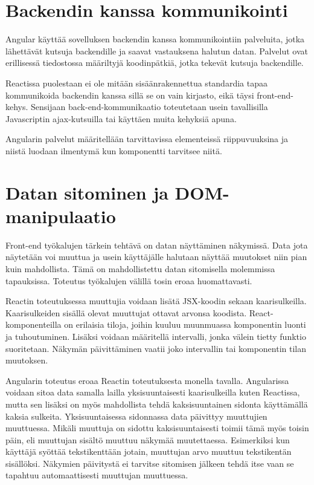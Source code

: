 \documentclass[a4paper,12pt,twoside]{article} %
\begin{document}
{\newpage

\section{Backendin kanssa kommunikointi}

Angular käyttää sovelluksen backendin kanssa kommunikointiin palveluita, jotka lähettävät kutsuja backendille ja saavat vastauksena halutun datan. Palvelut ovat erillisessä tiedostossa määriltyjä koodinpätkiä, jotka tekevät kutsuja backendille.

\vspace{4mm}\noindent
Reactissa puolestaan ei ole mitään sisäänrakennettua standardia tapaa kommunikoida backendin kanssa sillä se on vain kirjasto, eikä täysi front-end-kehys. Sensijaan back-end-kommunikaatio toteutetaan usein tavallisilla Javascriptin ajax-kutsuilla tai käyttäen muita kehyksiä apuna.

\vspace{4mm}\noindent
Angularin palvelut määritellään tarvittavissa elementeissä riippuvuuksina ja niistä luodaan ilmentymä kun komponentti tarvitsee niitä.

\newpage

\section{Datan sitominen ja DOM-manipulaatio}

Front-end työkalujen tärkein tehtävä on datan näyttäminen näkymissä. Data jota näytetään voi muuttua ja usein käyttäjälle halutaan näyttää muutokset niin pian kuin mahdollista. Tämä on mahdollistettu datan sitomisella molemmissa tapauksissa. Toteutus työkalujen välillä tosin eroaa huomattavasti.

\vspace{4mm}\noindent Reactin toteutuksessa muuttujia voidaan lisätä JSX-koodin sekaan kaarisulkeilla. Kaarisulkeiden sisällä olevat muuttujat ottavat arvonsa koodista. React-komponenteilla on erilaisia tiloja, joihin kuuluu muunmuassa komponentin luonti ja tuhoutuminen. Lisäksi voidaan määritellä intervalli, jonka välein tietty funktio suoritetaan. Näkymän päivittäminen vaatii joko intervallin tai komponentin tilan muutoksen.

\vspace{4mm}\noindent
Angularin toteutus eroaa Reactin toteutuksesta monella tavalla. Angularissa voidaan sitoa data samalla lailla yksisuuntaisesti kaarisulkeilla kuten Reactissa, mutta sen lisäksi on myös mahdollista tehdä kaksisuuntainen sidonta käyttämällä kaksia sulkeita. Yksisuuntaisessa sidonnassa data päivittyy muuttujien muuttuessa. Mikäli muuttuja on sidottu kaksisuuntaisesti toimii tämä myös toisin päin, eli muuttujan sisältö muuttuu näkymää muutettaessa. Esimerkiksi kun käyttäjä syöttää tekstikenttään jotain, muuttujan arvo muuttuu tekstikentän sisällöksi. Näkymien päivitystä ei tarvitse sitomisen jälkeen tehdä itse vaan se tapahtuu automaattisesti muuttujan muuttuessa.

}
\end{document}
